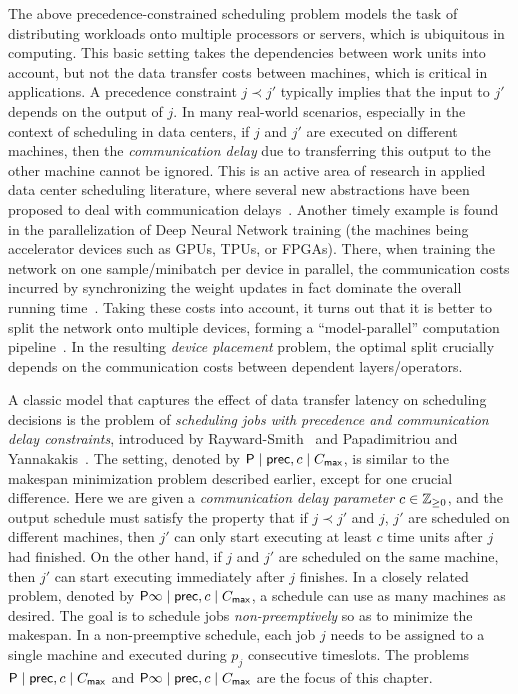 The above precedence-constrained scheduling problem models the task of distributing workloads onto multiple processors or servers, which is ubiquitous in computing.
This basic setting takes the dependencies between work units into account, but not the data transfer costs between machines, which is critical in applications. 
A precedence constraint $j \prec j'$ typically implies that the input to $j'$ depends on the output of $j$.
In many real-world scenarios, especially in the context of scheduling in data centers, if $j$ and $j'$ are executed on different machines, then the {\em communication delay} due to transferring this output to the other machine cannot be ignored.
This is an active area of research in applied data center scheduling literature, where several new abstractions have been proposed to deal with communication delays~\cite{Chowdhury, guo2012spotting,hong2012finishing,shymyrbay2018meeting,zhang2012optimizing,zhao2015rapier,luo2016towards}.
 Another timely example is found in the parallelization of Deep Neural Network training
(the machines being accelerator devices such as GPUs, TPUs, or FPGAs).
There, when training the network on one sample/minibatch per device in parallel, the communication costs incurred by synchronizing the weight updates in fact dominate the overall running time~\cite{narayanan2018pipedream}.
Taking these costs into account,
it turns out that
it is better to split the network onto multiple devices, forming a ``model-parallel'' computation pipeline~\cite{huang2019gpipe}.
In the resulting \emph{device placement} problem,
the optimal split crucially depends on the communication costs
between dependent layers/operators.


\medskip

A classic model that captures the effect of data transfer latency on scheduling decisions is the problem of {\em scheduling jobs with precedence and communication delay constraints}, introduced by Rayward-Smith~\cite{RAYWARDSMITH1987} and Papadimitriou and Yannakakis~\cite{PapadimitriouY90}.
The setting, denoted by $\mathsf{P} \mid \mathsf{prec}, c \mid C_{\mathsf{max}}$, is similar to the makespan minimization problem described earlier, except for one crucial difference.
Here  we are  given a {\em communication delay parameter} $c \in  \mathbb{Z}_{\ge 0}$, and the output schedule must satisfy the property that if $j \prec j'$ and $j$, $j'$ are scheduled on {different machines}, then $j'$ can only start executing at least $c$ time units after $j$ had finished. 
On the other hand,  if $j$ and $j'$ are scheduled on the {same machine}, then $j'$ can start executing immediately after $j$ finishes. 
In a closely related problem, denoted by $\mathsf{P} \infty \mid \mathsf{prec}, c \mid C_{\mathsf{max}}$, a schedule can use as many machines as desired.
The goal is to schedule jobs {\em non-preemptively} so as to minimize the makespan.  In a non-preemptive schedule, each job $j$ needs to be  assigned to a single machine and executed during $p_j$ consecutive timeslots.
The problems $\mathsf{P} \mid \mathsf{prec}, c \mid C_{\mathsf{max}}$ and $\mathsf{P} \infty \mid \mathsf{prec}, c \mid C_{\mathsf{max}}$ are the focus of this chapter.

